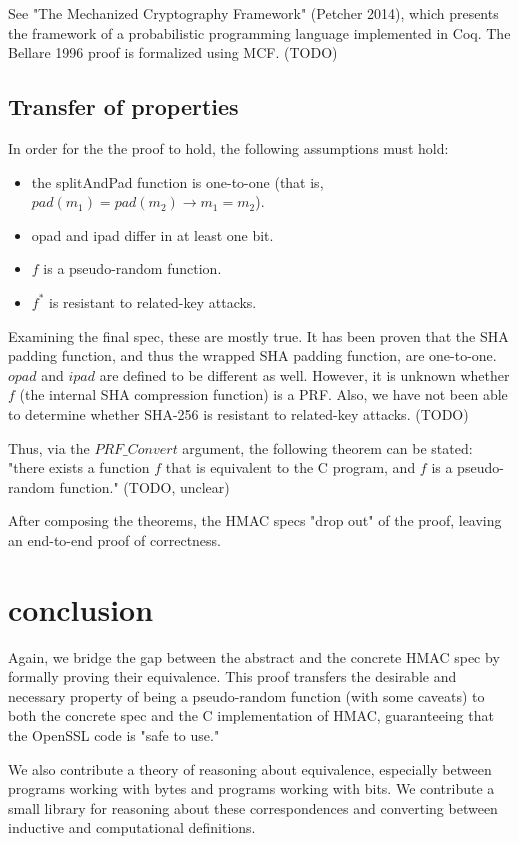 \documentclass[twocolumn,showpacs,%
  nofootinbib,aps,superscriptaddress,%
  eqsecnum,prd,notitlepage,showkeys,10pt]{revtex4-1}
\begin{document}
See "The Mechanized Cryptography Framework" (Petcher 2014), which presents the framework of a probabilistic programming language implemented in Coq. The Bellare 1996 proof is formalized using MCF. (TODO)

\subsection{Transfer of properties}

In order for the the proof to hold, the following assumptions must hold:
\begin{itemize}
\item the splitAndPad function is one-to-one (that is, $pad(m_1) = pad(m_2) \rightarrow m_1 = m_2$).
\item opad and ipad differ in at least one bit.
\item $f$ is a pseudo-random function.
\item $f^*$ is resistant to related-key attacks.
\end{itemize}

Examining the final spec, these are mostly true. It has been proven that the SHA padding function, and thus the wrapped SHA padding function, are one-to-one. $opad$ and $ipad$ are defined to be different as well. However, it is unknown whether $f$ (the internal SHA compression function) is a PRF. Also, we have not been able to determine whether SHA-256 is resistant to related-key attacks. (TODO)

Thus, via the $PRF\_Convert$ argument, the following theorem can be stated: "there exists a function $f$ that is equivalent to the C program, and $f$ is a pseudo-random function." (TODO, unclear)

After composing the theorems, the HMAC specs "drop out" of the proof, leaving an end-to-end proof of correctness.

\section{conclusion}

Again, we bridge the gap between the abstract and the concrete HMAC spec by formally proving their equivalence. This proof transfers the desirable and necessary property of being a pseudo-random function (with some caveats) to both the concrete spec and the C implementation of HMAC, guaranteeing that the OpenSSL code is "safe to use."

We also contribute a theory of reasoning about equivalence, especially between programs working with bytes and programs working with bits. We contribute a small library for reasoning about these correspondences and converting between inductive and computational definitions.
\end{document}
